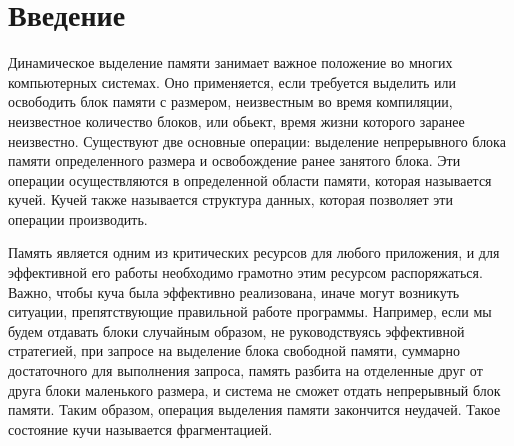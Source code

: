 \documentclass[12pt,a4paper]{article}
\renewcommand\baselinestretch{1.5}
\begin{document}
	



\tableofcontents    
\newpage
\section*{Введение}

Динамическое выделение памяти занимает важное положение во многих компьютерных системах. Оно применяется,
если требуется выделить или освободить блок памяти с размером, неизвестным во время компиляции, неизвестное количество блоков, или обьект, время жизни которого заранее неизвестно. 
Существуют две основные операции: выделение непрерывного блока памяти определенного размера и освобождение ранее занятого блока. Эти операции осуществляются в определенной области памяти, которая называется кучей. Кучей также называется структура данных, которая позволяет эти операции производить.

Память является одним из критических ресурсов для любого приложения, и для эффективной его работы необходимо грамотно этим ресурсом распоряжаться. Важно, чтобы куча была эффективно реализована, иначе могут возникуть ситуации, препятствующие правильной работе программы. Например, если мы будем отдавать блоки случайным образом, не руководствуясь эффективной стратегией,
при запросе на выделение блока свободной памяти, суммарно достаточного для выполнения запроса, память разбита на отделенные друг от друга блоки маленького размера, и система не 
сможет отдать непрерывный блок памяти. Таким образом, операция выделения памяти закончится неудачей. 
Такое состояние кучи называется фрагментацией.
\end{document}

